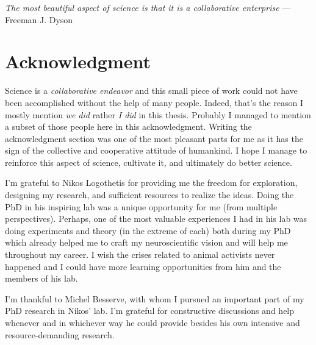 

\begin{flushright}{\slshape    
The most beautiful aspect of science is that it is a collaborative enterprise} %
--- Freeman J. Dyson
\end{flushright}

\bigskip


\begingroup

\let\clearpage\relax
\let\cleardoublepage\relax
\let\cleardoublepage\relax
\chapter*{Acknowledgment} %


Science is a \emph{collaborative endeavor}
and this small piece of work could not have been accomplished without the help of many people.
Indeed, that's the reason I mostly mention \emph{we did} rather \emph{I did} in this thesis.
Probably I managed to mention a subset of those people here in this acknowledgment.
Writing the acknowledgment section was one of the most pleasant parts for me as it has the sign of the collective and cooperative attitude of humankind.
I hope I manage to reinforce this aspect of science, cultivate it, and ultimately do better science.


I'm grateful to Nikos Logothetis
for providing me
the freedom for exploration, designing my research, and sufficient resources to realize the ideas.
Doing the PhD in his inspiring lab was a unique opportunity for me (from multiple perspectives).
Perhaps, one of the most valuable experiences I had in his lab was doing experiments and theory (in the extreme of each) both during my PhD which already helped me to craft my neuroscientific vision and will help me throughout my career.
I wish the crises related to animal activists never happened and I could have more learning opportunities from him and the members of his lab.


I'm thankful to Michel Besserve,
with whom I pursued an important part of my PhD research in Nikos' lab.
I'm grateful for constructive discussions and help whenever and in whichever way he could provide 
besides his own intensive and resource-demanding research.


